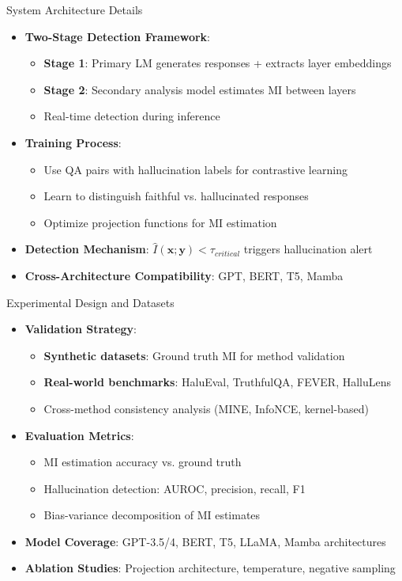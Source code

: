 \documentclass[aspectratio=169]{beamer}
\begin{document}
\begin{frame}{System Architecture Details}
\begin{itemize}
    \item \textbf{Two-Stage Detection Framework}:
    \begin{itemize}
        \item \textbf{Stage 1}: Primary LM generates responses + extracts layer embeddings
        \item \textbf{Stage 2}: Secondary analysis model estimates MI between layers
        \item Real-time detection during inference
    \end{itemize}
    \item \textbf{Training Process}:
    \begin{itemize}
        \item Use QA pairs with hallucination labels for contrastive learning
        \item Learn to distinguish faithful vs. hallucinated responses
        \item Optimize projection functions for MI estimation
    \end{itemize}
    \item \textbf{Detection Mechanism}: $\hat{I}(\mathbf{x}; \mathbf{y}) < \tau_{critical}$ triggers hallucination alert
    \item \textbf{Cross-Architecture Compatibility}: GPT, BERT, T5, Mamba
\end{itemize}
\end{frame}

\begin{frame}{Experimental Design and Datasets}
\begin{itemize}
    \item \textbf{Validation Strategy}:
    \begin{itemize}
        \item \textbf{Synthetic datasets}: Ground truth MI for method validation
        \item \textbf{Real-world benchmarks}: HaluEval, TruthfulQA, FEVER, HalluLens
        \item Cross-method consistency analysis (MINE, InfoNCE, kernel-based)
    \end{itemize}
    \item \textbf{Evaluation Metrics}:
    \begin{itemize}
        \item MI estimation accuracy vs. ground truth
        \item Hallucination detection: AUROC, precision, recall, F1
        \item Bias-variance decomposition of MI estimates
    \end{itemize}
    \item \textbf{Model Coverage}: GPT-3.5/4, BERT, T5, LLaMA, Mamba architectures
    \item \textbf{Ablation Studies}: Projection architecture, temperature, negative sampling
\end{itemize}
\end{frame}
\end{document}

